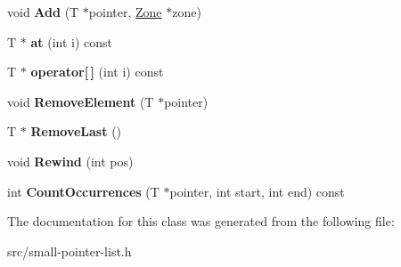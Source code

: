 \begin{DoxyCompactItemize}
\item 
\hypertarget{classv8_1_1internal_1_1_small_pointer_list_a73fa62b423378831be588543ee08eb4c}{}void {\bfseries Add} (T $\ast$pointer, \hyperlink{classv8_1_1internal_1_1_zone}{Zone} $\ast$zone)\label{classv8_1_1internal_1_1_small_pointer_list_a73fa62b423378831be588543ee08eb4c}

\item 
\hypertarget{classv8_1_1internal_1_1_small_pointer_list_a701a85d219fd2f10e0d41699ac51be1a}{}T $\ast$ {\bfseries at} (int i) const \label{classv8_1_1internal_1_1_small_pointer_list_a701a85d219fd2f10e0d41699ac51be1a}

\item 
\hypertarget{classv8_1_1internal_1_1_small_pointer_list_a8cc85a975217e7c0fedc49698d8b7a36}{}T $\ast$ {\bfseries operator\mbox{[}$\,$\mbox{]}} (int i) const \label{classv8_1_1internal_1_1_small_pointer_list_a8cc85a975217e7c0fedc49698d8b7a36}

\item 
\hypertarget{classv8_1_1internal_1_1_small_pointer_list_ae9243336248efac953019f9af438869e}{}void {\bfseries Remove\+Element} (T $\ast$pointer)\label{classv8_1_1internal_1_1_small_pointer_list_ae9243336248efac953019f9af438869e}

\item 
\hypertarget{classv8_1_1internal_1_1_small_pointer_list_a400981534ca6b80a29dd47e4c1a24a26}{}T $\ast$ {\bfseries Remove\+Last} ()\label{classv8_1_1internal_1_1_small_pointer_list_a400981534ca6b80a29dd47e4c1a24a26}

\item 
\hypertarget{classv8_1_1internal_1_1_small_pointer_list_a5477076c9179ed02a0cd770d4010bdbd}{}void {\bfseries Rewind} (int pos)\label{classv8_1_1internal_1_1_small_pointer_list_a5477076c9179ed02a0cd770d4010bdbd}

\item 
\hypertarget{classv8_1_1internal_1_1_small_pointer_list_a0511a5d5b96d6b2234074c27dd2a52d2}{}int {\bfseries Count\+Occurrences} (T $\ast$pointer, int start, int end) const \label{classv8_1_1internal_1_1_small_pointer_list_a0511a5d5b96d6b2234074c27dd2a52d2}

\end{DoxyCompactItemize}


The documentation for this class was generated from the following file\+:\begin{DoxyCompactItemize}
\item 
src/small-\/pointer-\/list.\+h\end{DoxyCompactItemize}
